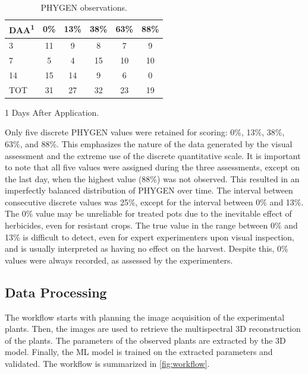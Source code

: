 \documentclass[12pt,a4paper,oneside]{report}
\begin{document}
\begin{table}[H]
    \centering
    \caption{PHYGEN observations.}
    \begin{threeparttable}
    \begin{tabular}{p{3cm}ccccc}
    \toprule
    \textbf{DAA\textsuperscript{1}} & \textbf{0\%} & \textbf{13\%} & \textbf{38\%} & \textbf{63\%} & \textbf{88\%} \\
    \midrule
    3 & 11 & 9 & 8 & 7 & 9 \\
    7 & 5 & 4 & 15 & 10 & 10 \\
    14 & 15 & 14 & 9 & 6 & 0 \\
    TOT & 31 & 27 & 32 & 23 & 19 \\
    \bottomrule
    \end{tabular}
    \begin{tablenotes}
    \item[1] Days After Application.
    \end{tablenotes}
    \end{threeparttable}
    \label{tab:PHYGEN_observations}
\end{table}

Only five discrete PHYGEN values were retained for scoring: 0\%, 13\%, 38\%, 63\%, and 88\%. This emphasizes the nature of the data generated by the visual assessment and the extreme use of the discrete quantitative scale. It is important to note that all five values were assigned during the three assessments, except on the last day, when the highest value (88\%) was not observed. This resulted in an imperfectly balanced distribution of PHYGEN over time. The interval between consecutive discrete values was 25\%, except for the interval between 0\% and 13\%. The 0\% value may be unreliable for treated pots due to the inevitable effect of herbicides, even for resistant crops. The true value in the range between 0\% and 13\% is difficult to detect, even for expert experimenters upon visual inspection, and is usually interpreted as having no effect on the harvest. Despite this, 0\% values were always recorded, as assessed by the experimenters.

\subsection{Data Processing}

The workflow starts with planning the image acquisition of the experimental plants. Then, the images are used to retrieve the multispectral 3D reconstruction of the plants. The parameters of the observed plants are extracted by the 3D model. Finally, the ML model is trained on the extracted parameters and validated. The workflow is summarized in
\cref{fig:workflow}.
\end{document}
